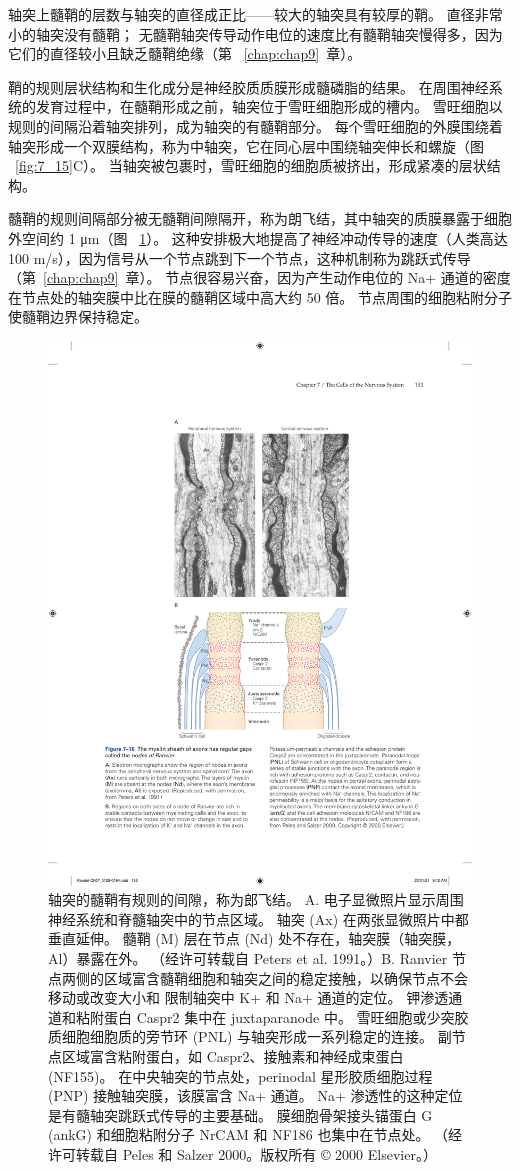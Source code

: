 轴突上髓鞘的层数与轴突的直径成正比——较大的轴突具有较厚的鞘。
直径非常小的轴突没有髓鞘；
无髓鞘轴突传导动作电位的速度比有髓鞘轴突慢得多，因为它们的直径较小且缺乏髓鞘绝缘（第 ~\ref{chap:chap9}~章）。


鞘的规则层状结构和生化成分是神经胶质质膜形成髓磷脂的结果。
在周围神经系统的发育过程中，在髓鞘形成之前，轴突位于雪旺细胞形成的槽内。
雪旺细胞以规则的间隔沿着轴突排列，成为轴突的有髓鞘部分。
每个雪旺细胞的外膜围绕着轴突形成一个双膜结构，称为中轴突，它在同心层中围绕轴突伸长和螺旋（图 ~\ref{fig:7_15}C）。 
当轴突被包裹时，雪旺细胞的细胞质被挤出，形成紧凑的层状结构。


髓鞘的规则间隔部分被无髓鞘间隙隔开，称为朗飞结，其中轴突的质膜暴露于细胞外空间约 1 μm（图 ~\ref{fig:7_16}）。 
这种安排极大地提高了神经冲动传导的速度（人类高达 100 m/s），因为信号从一个节点跳到下一个节点，这种机制称为跳跃式传导（第~\ref{chap:chap9}~章）。 
节点很容易兴奋，因为产生动作电位的 Na+ 通道的密度在节点处的轴突膜中比在膜的髓鞘区域中高大约 50 倍。
节点周围的细胞粘附分子使髓鞘边界保持稳定。


\begin{figure}[htbp]
	\centering
	\includegraphics[width=0.6\linewidth]{chap07/fig_7_16}
	\caption{轴突的髓鞘有规则的间隙，称为郎飞结。 A. 电子显微照片显示周围神经系统和脊髓轴突中的节点区域。 轴突 (Ax) 在两张显微照片中都垂直延伸。 髓鞘 (M) 层在节点 (Nd) 处不存在，轴突膜（轴突膜，Al）暴露在外。 （经许可转载自 Peters et al. 1991。）B. Ranvier 节点两侧的区域富含髓鞘细胞和轴突之间的稳定接触，以确保节点不会移动或改变大小和 限制轴突中 K+ 和 Na+ 通道的定位。 钾渗透通道和粘附蛋白 Caspr2 集中在 juxtaparanode 中。 雪旺细胞或少突胶质细胞细胞质的旁节环 (PNL) 与轴突形成一系列稳定的连接。 副节点区域富含粘附蛋白，如 Caspr2、接触素和神经成束蛋白 (NF155)。 在中央轴突的节点处，perinodal 星形胶质细胞过程 (PNP) 接触轴突膜，该膜富含 Na+ 通道。 Na+ 渗透性的这种定位是有髓轴突跳跃式传导的主要基础。 膜细胞骨架接头锚蛋白 G (ankG) 和细胞粘附分子 NrCAM 和 NF186 也集中在节点处。 （经许可转载自 Peles 和 Salzer 2000。版权所有 © 2000 Elsevier。）}
	\label{fig:7_16}
\end{figure}


